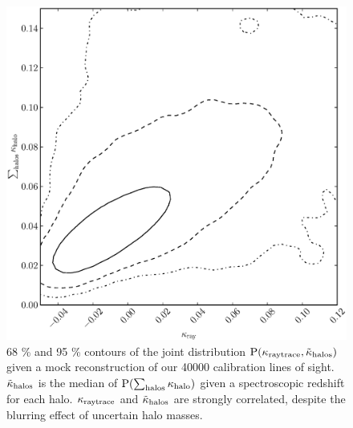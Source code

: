 \documentclass[useAMS,usenatbib]{mn2e}
\begin{document}
\begin{figure}
\includegraphics[width=\columnwidth]{figs/cornerplot.eps}
\caption{68 \% and 95 \% contours of the joint distribution ${\rm P}(\kappa_{\rm raytrace}, \tilde\kappa_{\rm halos})$ given a mock reconstruction of our 40000 calibration lines of sight. $\tilde\kappa_{\rm halos}$ is the median of ${\rm P}(\sum_{\rm halos} \kappa_{\rm halo})$ given a spectroscopic redshift for each halo. $\kappa_{\rm raytrace}$ and $\tilde\kappa_{\rm halos}$ are strongly correlated, despite the blurring effect of uncertain halo masses.}
\label{fig:corner}
\end{figure}
\end{document}
